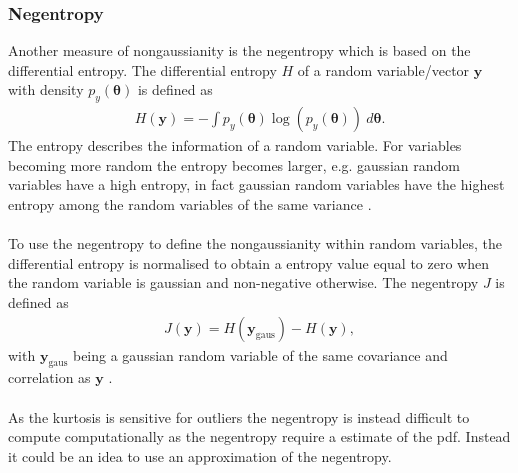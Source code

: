 \subsubsection{Negentropy}
Another measure of nongaussianity is the negentropy which is based  on the differential entropy. The differential entropy $H$ of a random variable/vector $\mathbf{y}$ with density $p_y (\boldsymbol{\theta})$ is defined as
\begin{align*}
H(\mathbf{y}) = - \int p_y (\boldsymbol{\theta}) \log (p_y (\boldsymbol{\theta})) \ d\boldsymbol{\theta}.
\end{align*}
The entropy describes the information of a random variable. For variables becoming more random the entropy becomes larger, e.g. gaussian random variables have a high entropy, in fact gaussian random variables have the highest entropy among the random variables of the same variance \cite[p. 182]{ICA}.
\\ \\
To use the negentropy to define the nongaussianity within random variables, the differential entropy is normalised to obtain a entropy value equal to zero when the random variable is gaussian and non-negative otherwise. The negentropy $J$ is defined as 
\begin{align*}
J(\mathbf{y}) = H(\mathbf{y}_{\text{gaus}}) - H(\mathbf{y}),
\end{align*}
with $\mathbf{y}_{\text{gaus}}$ being a gaussian random variable of the same covariance and correlation as $\mathbf{y}$ \cite[p. 182]{ICA}.
\\ \\
As the kurtosis is sensitive for outliers the negentropy is instead difficult to compute computationally as the negentropy require a estimate of the pdf. Instead it could be an idea to use an approximation of the negentropy.
 
